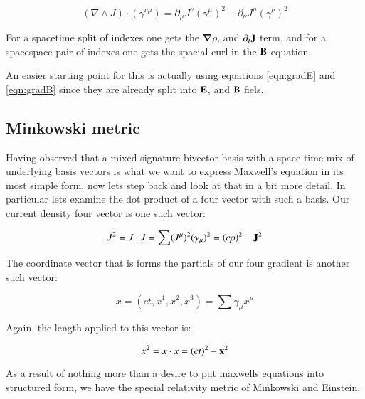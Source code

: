\documentclass{article}      %
\newcommand{\spacegrad}[0]{\boldsymbol{\nabla}}
\newcommand{\grad}[0]{\nabla}
\begin{document}
\begin{equation*}
(\grad \wedge J) \cdot (\gamma^{\nu\mu}) = \partial_{\mu}J^{\nu} (\gamma^{\mu})^2 - \partial_{\nu}J^{\mu} (\gamma^{\nu})^2
\end{equation*}

For a spacetime split of indexes one gets the $\spacegrad\rho$, and $\partial_t \mathbf{J}$ term, and for a spacespace pair of indexes one gets the spacial curl in the $\mathbf{B}$ equation.

An easier starting point for this is actually using equations \ref{eqn:gradE} and \ref{eqn:gradB} since they are already split into $\mathbf{E}$, and $\mathbf{B}$ fiels.

\subsection{ Minkowski metric }

Having observed that a mixed signature bivector basis with a space time mix of underlying basis vectors is what we want to
express Maxwell's equation in its most simple form, now lets step back and look at that in a bit more detail.  In particular
lets examine the dot product of a four vector with such a basis.  Our current density four vector is one such vector:

\begin{align*}
J^2 = J \cdot J = \sum (J^{\mu})^2 (\gamma_{\mu})^2 = (c\rho)^2 - \mathbf{J}^2
\end{align*}

The coordinate vector that is forms the partials of our four gradient is another such vector:

\begin{equation*}
x = (ct, x^1, x^2, x^3) = \sum \gamma_{\mu} x^{\mu}
\end{equation*}

Again, the length applied to this vector is:

\begin{equation}
x^2 = x \cdot x = (ct)^2 - \mathbf{x}^2
\end{equation}

As a result of nothing more than a desire to put maxwells equations into structured form, we have the special relativity metric
of Minkowski and Einstein.
\end{document}
